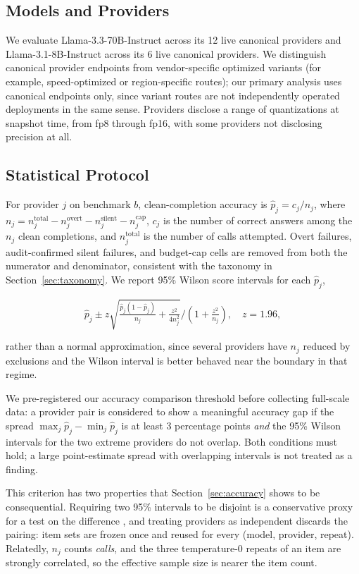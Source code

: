\documentclass[11pt]{article}
\begin{document}
\subsection{Models and Providers}

We evaluate Llama-3.3-70B-Instruct across its 12 live canonical
providers and Llama-3.1-8B-Instruct across its 6 live canonical
providers. We distinguish canonical provider endpoints from
vendor-specific optimized variants (for example, speed-optimized or
region-specific routes); our primary analysis uses canonical
endpoints only, since variant routes are not independently operated
deployments in the same sense. Providers disclose a range of
quantizations at snapshot time, from fp8 through fp16, with some
providers not disclosing precision at all.

\subsection{Statistical Protocol}
\label{sec:stats}

For provider $j$ on benchmark $b$, clean-completion accuracy is
$\hat{p}_j = c_j / n_j$, where $n_j = n_j^{\text{total}} -
n_j^{\text{overt}} - n_j^{\text{silent}} - n_j^{\text{cap}}$, $c_j$ is
the number of correct answers among the $n_j$ clean completions, and
$n_j^{\text{total}}$ is the number of calls attempted. Overt failures,
audit-confirmed silent failures, and budget-cap cells are removed from
both the numerator and denominator, consistent with the taxonomy in
Section~\ref{sec:taxonomy}. We report 95\% Wilson score intervals for
each $\hat{p}_j$,

\[
\hat{p}_j \pm z \sqrt{\tfrac{\hat{p}_j(1-\hat{p}_j)}{n_j} + \tfrac{z^2}{4n_j^2}}
\Big/ \left(1 + \tfrac{z^2}{n_j}\right), \quad z = 1.96,
\]

\noindent rather than a normal approximation, since several providers
have $n_j$ reduced by exclusions and the Wilson interval is better
behaved near the boundary in that regime.

We pre-registered our accuracy comparison threshold before collecting
full-scale data: a provider pair is considered to show a meaningful
accuracy gap if the spread $\max_j \hat{p}_j - \min_j \hat{p}_j$ is at
least 3 percentage points \emph{and} the 95\% Wilson intervals for the
two extreme providers do not overlap. Both conditions must hold; a
large point-estimate spread with overlapping intervals is not treated
as a finding.

This criterion has two properties that Section~\ref{sec:accuracy}
shows to be consequential. Requiring two 95\% intervals to be disjoint
is a conservative proxy for a test on the difference
\citep{dror2018hitchhiker}, and treating providers as independent
discards the pairing: item sets are frozen once and reused for every
(model, provider, repeat). Relatedly, $n_j$ counts \emph{calls}, and
the three temperature-0 repeats of an item are strongly correlated, so
the effective sample size is nearer the item count.
\end{document}

